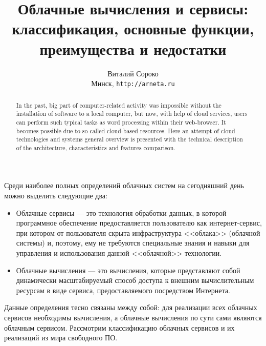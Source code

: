 \documentclass[a5paper,10pt]{article}
\begin{document}
\title{Облачные вычисления и сервисы: классификация, основные функции, преимущества и недостатки}

\author{Виталий Сороко\\ 
\small Минск, \texttt{http://arneta.ru}
}
\maketitle
\begin{abstract}
In the past, big part of computer-related activity was impos\-sible without the installation of software to a local computer, but now, with help of cloud services, users can perform such typical tasks as word processing within their web-browser. It becomes possible due to so called cloud-based resources. Here an attempt of  cloud technologies and systems general overview is presented with the technical description of the architecture, characteristics and features comparison. 
\end{abstract}

Среди наиболее полных определений облачных систем на сегодняшний день можно выделить следующие два:
\begin{itemize}
\item Облачные сервисы --- это технология обработки данных, в которой программное обеспечение предоставляется пользователю как интернет-сервис, при котором от пользователя скрыта инфраструктура <<облака>> (облачной системы) и, поэтому, ему не требуются специальные знания и навыки для  управления и использования данной <<облачной>> технологии.
\item Облачные вычисления --- это вычисления, которые представляют собой динамически масштабируемый способ доступа к внешним вычислительным ресурсам в виде сервиса, предоставляемого посредством Интернета.
\end{itemize}

Данные определения тесно связаны между собой: для реализации всех облачных сервисов необходимы вычисления, а облачные вычисления по сути сами являются облачным сервисом. Рассмотрим классификацию облачных сервисов и их реализаций из мира свободного ПО.
\end{document}
